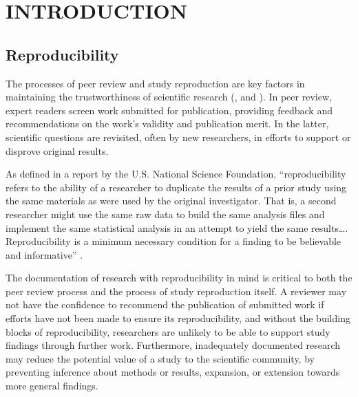 \chapter{INTRODUCTION}

\section{Reproducibility}
The processes of peer review and study reproduction are key factors in maintaining
the trustworthiness of scientific research (\cite[25]{university_of_california_museum_of_paleontology_how_2022},
\cite[35]{gazzaniga_psychological_2018} and \cite{nicholas_peer_2015}). In peer
review, expert readers screen work submitted for publication, providing feedback
and recommendations on the work’s validity and publication merit. In the latter,
scientific questions are revisited, often by new researchers, in efforts to
support or disprove original results.

As defined in a report by the U.S. National Science Foundation,
“reproducibility refers to the ability of a researcher to duplicate the results
of a prior study using the same materials as were used by the original
investigator. That is, a second researcher might use the same raw data to build
the same analysis files and implement the same statistical analysis in an
attempt to yield the same results…. Reproducibility is a minimum necessary
condition for a finding to be believable and informative” \parencite[3]{cacioppo_social_2015}.

The documentation of research with reproducibility in mind is critical to
both the peer review process and the process of study reproduction itself. A
reviewer may not have the confidence to recommend the publication of submitted
work if efforts have not been made to ensure its reproducibility, and without
the building blocks of reproducibility, researchers are unlikely to be able to
support study findings through further work. Furthermore, inadequately
documented research may reduce the potential value of a study to the scientific
community, by preventing inference about methods or results, expansion, or
extension towards more general findings.

